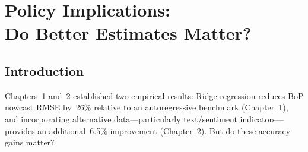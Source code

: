 \chapter{Policy Implications:\\Do Better Estimates Matter?}
\label{ch:policy}

\begin{abstract}
This chapter bridges the gap between statistical accuracy and policy relevance.  Three exercises assess whether the improved BoP nowcasts documented in Chapters~1--2 matter for macroeconomic policy.  \emph{Part~A} evaluates nowcast performance during three crisis episodes---GFC (2008--09), COVID-19 (2020--21), and the 2022 energy shock---finding that Ridge nowcasts maintained substantial accuracy gains (up to~18\% RMSE reduction during COVID, confirmed by the \citet{clark2007approximately} test at the~5\% level) precisely when timely information was most valuable.  \emph{Part~B} tests cross-country generalisability: applying the Ridge framework to Germany, Italy, and Spain yields RMSE improvements of~2--20\% over AR(1), statistically significant for three of four countries with out-of-sample~$R^2$ of~0.05--0.36.  \emph{Part~C} conducts a counterfactual policy analysis using a Taylor-type rule with interest-rate smoothing and a BoP gap term: the estimated long-run CA gap coefficient is~$-0.46$, implying that persistent current account movements would eventually shift the implied policy rate.  Taken together, these results suggest that investing in AI-based BoP nowcasting would generate tangible policy value, particularly during crisis episodes.
\end{abstract}


\section{Introduction}
\label{sec:ch3_intro}

Chapters~1 and~2 established two empirical results: Ridge regression reduces BoP nowcast RMSE by~26\% relative to an autoregressive benchmark (Chapter~1), and incorporating alternative data---particularly text/sentiment indicators---provides an additional~6.5\% improvement (Chapter~2).  But do these accuracy gains matter?


